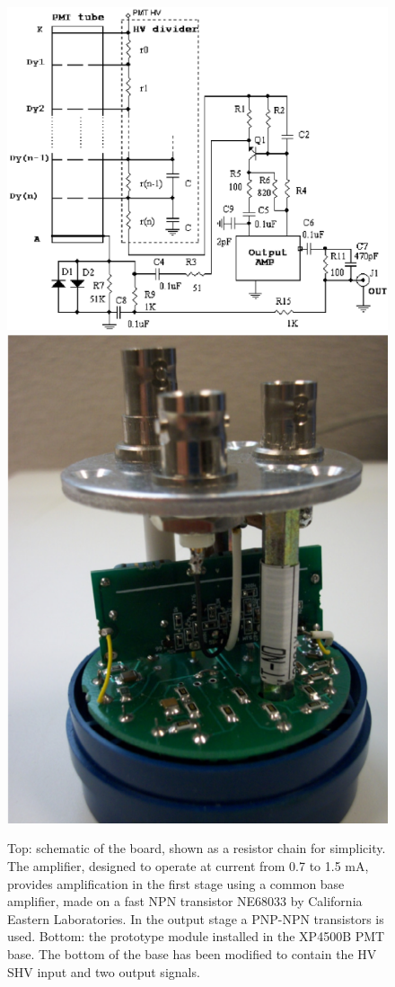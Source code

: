\begin{figure}
	\centering
	\includegraphics[width=0.95\columnwidth,keepaspectratio]{img/dividerSchematic.png}
	\includegraphics[width=0.95\columnwidth,keepaspectratio]{img/pmtWithDivider.png}
	\caption{Top: schematic of the board, shown as a resistor chain for simplicity. The amplifier, designed to operate at current from 0.7 to 1.5 mA,
            provides amplification in the first stage using a common base amplifier, made on a fast NPN transistor NE68033 by California Eastern Laboratories.
            In the output stage a PNP-NPN transistors is used.
            Bottom: the prototype module installed in the XP4500B PMT base.
            The bottom of the base has been modified to contain the HV SHV input and two output signals. }
	\label{fig:pmtWithDivider}
\end{figure}

